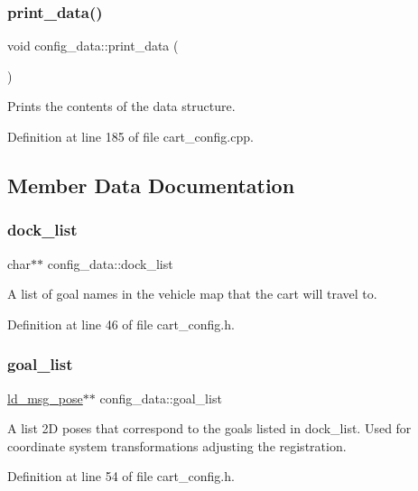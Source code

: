 \subsubsection{\texorpdfstring{print\+\_\+data()}{print\_data()}}
{\footnotesize\ttfamily void config\+\_\+data\+::print\+\_\+data (\begin{DoxyParamCaption}{ }\end{DoxyParamCaption})}

Prints the contents of the data structure. 

Definition at line 185 of file cart\+\_\+config.\+cpp.



\subsection{Member Data Documentation}
\mbox{\label{structconfig__data_a07fc464b6e930d7ff7f843cd4f4fe2dd}} 
\subsubsection{\texorpdfstring{dock\+\_\+list}{dock\_list}}
{\footnotesize\ttfamily char$\ast$$\ast$ config\+\_\+data\+::dock\+\_\+list}

A list of goal names in the vehicle map that the cart will travel to. 

Definition at line 46 of file cart\+\_\+config.\+h.

\mbox{\label{structconfig__data_ad5378ccb37d95d996823422eee9dc9fc}} 
\subsubsection{\texorpdfstring{goal\+\_\+list}{goal\_list}}
{\footnotesize\ttfamily \mbox{\hyperlink{structld__msg__pose}{ld\+\_\+msg\+\_\+pose}}$\ast$$\ast$ config\+\_\+data\+::goal\+\_\+list}

A list 2D poses that correspond to the goals listed in dock\+\_\+list. Used for coordinate system transformations adjusting the registration. 

Definition at line 54 of file cart\+\_\+config.\+h.

